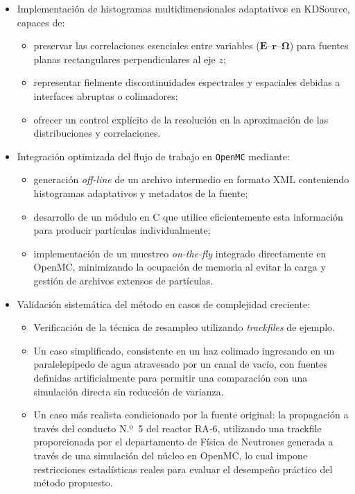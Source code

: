 \begin{itemize}
    \item Implementación de histogramas multidimensionales adaptativos en KDSource, capaces de:
    \begin{itemize}
        \item preservar las correlaciones esenciales entre variables ($\mathbf{E}$–$\mathbf{r}$–$\boldsymbol{\Omega}$) para fuentes planas rectangulares perpendiculares al eje $z$;
        \item representar fielmente discontinuidades espectrales y espaciales debidas a interfaces abruptas o colimadores;
        \item ofrecer un control explícito de la resolución en la aproximación de las distribuciones y correlaciones.
    \end{itemize}

    \item Integración optimizada del flujo de trabajo en \texttt{OpenMC} mediante:
    \begin{itemize}
        \item generación \emph{off-line} de un archivo intermedio en formato XML conteniendo histogramas adaptativos y metadatos de la fuente;
        \item desarrollo de un módulo en C que utilice eficientemente esta información para producir partículas individualmente;
        \item implementación de un muestreo \emph{on-the-fly} integrado directamente en OpenMC, minimizando la ocupación de memoria al evitar la carga y gestión de archivos extensos de partículas.
    \end{itemize}

    \item Validación sistemática del método en casos de complejidad creciente:
    \begin{itemize}
        \item Verificación de la técnica de resampleo utilizando \emph{trackfiles} de ejemplo.
        \item Un caso simplificado, consistente en un haz colimado ingresando en un paralelepípedo de agua atravesado por un canal de vacío, con fuentes definidas artificialmente para permitir una comparación con una simulación directa sin reducción de varianza. 
        \item Un caso más realista condicionado por la fuente original: la propagación a través del conducto N.º 5 del reactor RA‑6, utilizando una trackfile proporcionada por el departamento de Física de Neutrones generada a través de una simulación del núcleo en OpenMC, lo cual impone restricciones estadísticas reales para evaluar el desempeño práctico del método propuesto.
    \end{itemize}
\end{itemize}

